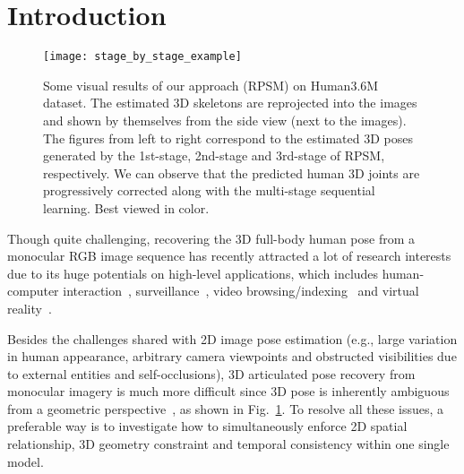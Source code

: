 \documentclass[10pt,twocolumn,letterpaper]{article}
\begin{document}
\section{Introduction}

\begin{figure}[h]
\centering
\texttt{[image: stage\_by\_stage\_example]}
\caption{Some visual results of our approach (RPSM) on Human3.6M dataset. The estimated 3D skeletons are reprojected into the images and shown by themselves from the side view (next to the images). The figures from left to right correspond to the estimated 3D poses generated by the 1st-stage, 2nd-stage and 3rd-stage of RPSM, respectively. We can observe that the predicted human 3D joints are progressively corrected along with the multi-stage sequential learning. Best viewed in color.}
\label{fig:3d_pose_example}
\end{figure}

Though quite challenging, recovering the 3D full-body human pose from a monocular RGB image sequence has recently attracted a lot of research interests due to its huge potentials on high-level applications, which includes human-computer interaction~\cite{errity2016human}, surveillance~\cite{held2012intelligent}, video browsing/indexing~\cite{chen2013video} and virtual reality~\cite{zz_rheingold1991virtual}.



Besides the challenges shared with 2D image pose estimation (e.g., large variation in human appearance, arbitrary camera viewpoints and obstructed visibilities due to external entities and self-occlusions), 3D articulated pose recovery from monocular imagery is much more difficult since 3D pose is inherently ambiguous from a geometric perspective~\cite{zhou2016deep}, as shown in Fig.~\ref{fig:3d_pose_example}. To resolve all these issues, a preferable way is to investigate how to simultaneously enforce 2D spatial relationship, 3D geometry constraint and temporal consistency within one single model.
\end{document}
